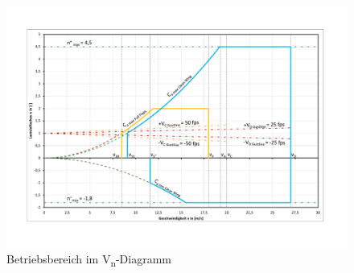 \begin{landscape}
\begin{figure}[H]
\centering
\includegraphics[height=0.945\textheight, trim={20mm 24mm 22mm 22mm},clip]{bilder/Formeln/VN-Diaggramm-rev-00.pdf}
\caption{Betriebsbereich im V\textsubscript{n}-Diagramm} 
\label{fig:Vn Diagramm des Flugsystems}
\end{figure}
\end{landscape}